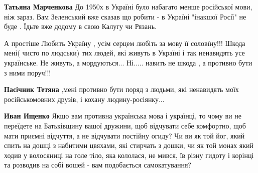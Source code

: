 \begin{itemize}
\begin{itemize}
\begin{itemize}
 
\textbf{Татьяна Марченкова} До 1950х в Україні було набагато менше російської мови, ніж зараз.
Вам Зеленський вже сказав що робити - в Україні "інакшої Росії" не буде . Їдьте вже додому в свою Калугу чи Рязань.
\end{itemize}

\end{itemize}

 

А простіше Любить Україну , усім серцем любіть за мову її соловїну!!! Шкода
мені( чисто по людськи) тих людей, які живуть в Україні і так ненавидять усе
українське. Не живуть, а мордуються... Ні..... навить не шкода , а противно бути
з ними поруч!!!

\begin{itemize}
 
\textbf{Пасічник Тетяна} ,мені противно бути поряд з людьми, які ненавидять моїх російськомовних друзів, і кохану людину-росіянку...

\begin{itemize}
 
\textbf{Иван Ищенко} Якщо вам противна українська мова і українці, то чому ви
не переїдете на Батьківщину вашої дружини, щоб відчувати себе комфортно, щоб
мати приємні відчуття, а не відчувати постійну огиду? Чи ви як той йог, який
спить на дошці з набитими цвяхами, які стирчать з дошки, чи як той монах який
ходив у волосяниці на голе тіло, яка кололася, не мився, їв різну гидоту і
корінці та розводив на собі вошей - вам подобається самокатування?
\end{itemize}


\end{itemize}
\end{itemize}
